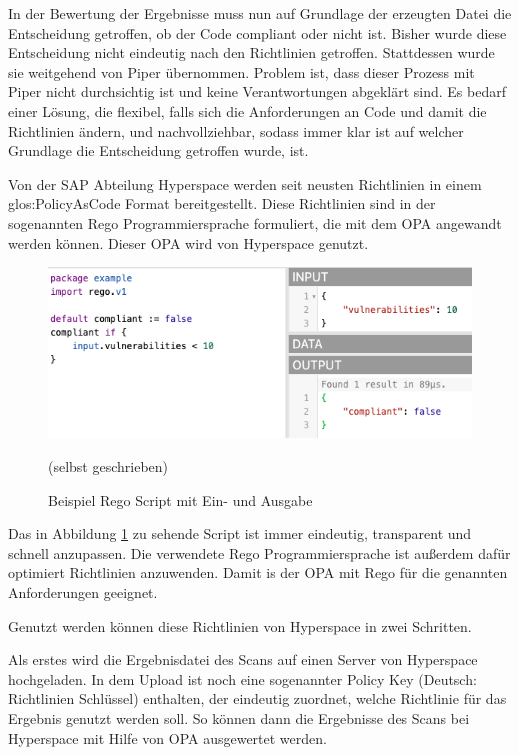 \documentclass[../main.tex]{subfiles}
\begin{document}
In der Bewertung der Ergebnisse muss nun auf Grundlage der erzeugten Datei die Entscheidung getroffen, ob der Code compliant oder nicht ist.
Bisher wurde diese Entscheidung nicht eindeutig nach den Richtlinien getroffen.
Stattdessen wurde sie weitgehend von Piper übernommen.
Problem ist, dass dieser Prozess mit Piper nicht durchsichtig ist und keine Verantwortungen abgeklärt sind.
Es bedarf einer Lösung, die flexibel, falls sich die Anforderungen an Code und damit die Richtlinien ändern, und nachvollziehbar, sodass immer klar ist auf welcher Grundlage die Entscheidung getroffen wurde, ist.

Von der SAP Abteilung Hyperspace werden seit neusten Richtlinien in einem \gls{glos:PolicyAsCode} Format bereitgestellt.
Diese Richtlinien sind in der sogenannten Rego Programmiersprache formuliert, die mit dem \gls{OPA} angewandt werden können.
Dieser \gls{OPA} wird von Hyperspace genutzt.

\begin{figure}[ht]
    \centering
    \includegraphics[scale=0.65]{bilder/regoexample.png}
    \caption{Beispiel Rego Script mit Ein- und Ausgabe}
    \footnotesize (selbst geschrieben)
    \label{fig:regoexample}
\end{figure}

Das in Abbildung \ref{fig:regoexample} zu sehende Script ist immer eindeutig, transparent und schnell anzupassen.
Die verwendete Rego Programmiersprache ist außerdem dafür optimiert Richtlinien anzuwenden.
Damit is der \gls{OPA} mit Rego für die genannten Anforderungen geeignet.
\cite{Rego}

Genutzt werden können diese Richtlinien von Hyperspace in zwei Schritten.

Als erstes wird die Ergebnisdatei des Scans auf einen Server von Hyperspace hochgeladen.
In dem Upload ist noch eine sogenannter Policy Key (Deutsch: Richtlinien Schlüssel) enthalten, der eindeutig zuordnet, welche Richtlinie für das Ergebnis genutzt werden soll.
So können dann die Ergebnisse des Scans bei Hyperspace mit Hilfe von \gls{OPA} ausgewertet werden.
\end{document}
